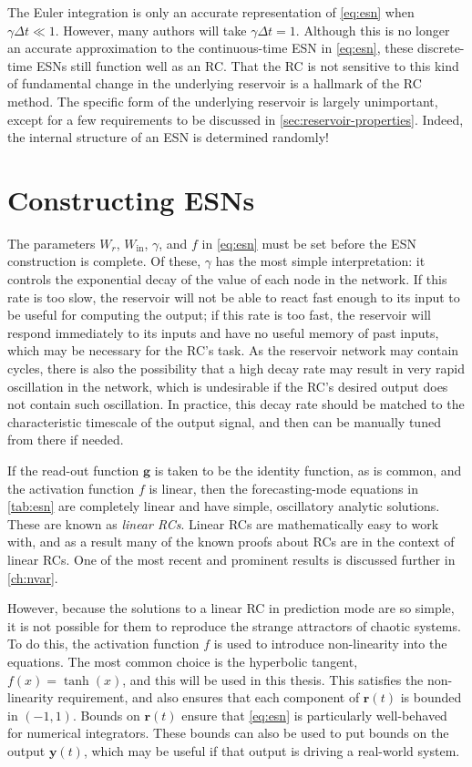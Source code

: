 The Euler integration is only an accurate representation of
\cref{eq:esn} when $\gamma \Delta t \ll 1$. However, many authors will
take $\gamma \Delta t = 1$. Although this is no longer an accurate
approximation to the continuous-time ESN in \cref{eq:esn}, these
discrete-time ESNs still function well as an RC. That the RC is not
sensitive to this kind of fundamental change in the underlying
reservoir is a hallmark of the RC method. The specific form of the
underlying reservoir is largely unimportant, except for a few
requirements to be discussed in
\cref{sec:reservoir-properties}. Indeed, the internal structure of an
ESN is determined randomly!

\section{Constructing ESNs}\label{sec:esn-construction}

The parameters $W_r$, $W_\text{in}$, $\gamma$, and $f$ in
\cref{eq:esn} must be set before the ESN construction is complete. Of
these, $\gamma$ has the most simple interpretation: it controls the
exponential decay of the value of each node in the network. If this
rate is too slow, the reservoir will not be able to react fast enough
to its input to be useful for computing the output; if this rate is
too fast, the reservoir will respond immediately to its inputs and
have no useful memory of past inputs, which may be necessary for the
RC's task. As the reservoir network may contain cycles, there is also
the possibility that a high decay rate may result in very rapid
oscillation in the network, which is undesirable if the RC's desired
output does not contain such oscillation. In practice, this decay rate
should be matched to the characteristic timescale of the output
signal, and then can be manually tuned from there if needed.

If the read-out function $\bm{g}$ is taken to be the identity
function, as is common, and the activation function $f$ is linear,
then the forecasting-mode equations in \cref{tab:esn} are completely
linear and have simple, oscillatory analytic solutions. These are
known as \emph{linear RCs}. Linear RCs are mathematically easy to work
with, and as a result many of the known proofs about RCs are in the
context of linear RCs. One of the most recent and prominent results is
discussed further in \cref{ch:nvar}.

However, because the solutions to a linear RC in prediction mode are
so simple, it is not possible for them to reproduce the strange
attractors of chaotic systems. To do this, the activation function $f$
is used to introduce non-linearity into the equations. The most common
choice is the hyperbolic tangent, $f(x) = \tanh(x)$, and this will be
used in this thesis. This satisfies the non-linearity requirement, and
also ensures that each component of $\bm{r}(t)$ is bounded in $(-1,
1)$. Bounds on $\bm{r}(t)$ ensure that \cref{eq:esn} is particularly
well-behaved for numerical integrators. These bounds can also be used
to put bounds on the output $\bm{y}(t)$, which may be useful if that
output is driving a real-world system.

